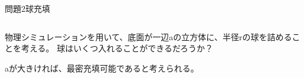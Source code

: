 \documentclass[dvipdfmx]{beamer}
\newenvironment{wideitemize}{\itemize\setlength{\itemsep}{1em}}{\enditemize}
\newenvironment{wideitemize2}{\itemize\setlength{\itemsep}{0.2em}}{\enditemize}
\begin{document}

\begin{frame}{問題2}{球充填}
\begin{columns}[t]
\begin{column}{0.7\textwidth}
\begin{wideitemize}
	\item 物理シミュレーションを用いて、底面が一辺aの立方体に、半径rの球を詰めることを考える。
	球はいくつ入れることができるだろうか？
	\begin{wideitemize2}
		\item aが大きければ、最密充填可能であると考えられる。
	\end{wideitemize2}

\end{wideitemize}


\end{column}
\end{columns}
\end{frame}
\end{document}
